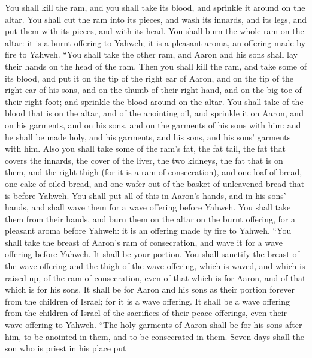  You shall kill the ram, and you shall take its blood,
and sprinkle it around on the altar.  You shall cut the
ram into its pieces, and wash its innards, and its legs, and put them
with its pieces, and with its head.  You shall burn the
whole ram on the altar: it is a burnt offering to Yahweh; it is a
pleasant aroma, an offering made by fire to Yahweh. 
``You shall take the other ram, and Aaron and his sons shall lay their
hands on the head of the ram.  Then you shall kill the
ram, and take some of its blood, and put it on the tip of the right ear
of Aaron, and on the tip of the right ear of his sons, and on the thumb
of their right hand, and on the big toe of their right foot; and
sprinkle the blood around on the altar.  You shall take
of the blood that is on the altar, and of the anointing oil, and
sprinkle it on Aaron, and on his garments, and on his sons, and on the
garments of his sons with him: and he shall be made holy, and his
garments, and his sons, and his sons' garments with him. 
Also you shall take some of the ram's fat, the fat tail, the fat that
covers the innards, the cover of the liver, the two kidneys, the fat
that is on them, and the right thigh (for it is a ram of consecration),
 and one loaf of bread, one cake of oiled bread, and one
wafer out of the basket of unleavened bread that is before Yahweh.
 You shall put all of this in Aaron's hands, and in his
sons' hands, and shall wave them for a wave offering before Yahweh.
 You shall take them from their hands, and burn them on
the altar on the burnt offering, for a pleasant aroma before Yahweh: it
is an offering made by fire to Yahweh.  ``You shall take
the breast of Aaron's ram of consecration, and wave it for a wave
offering before Yahweh. It shall be your portion.  You
shall sanctify the breast of the wave offering and the thigh of the wave
offering, which is waved, and which is raised up, of the ram of
consecration, even of that which is for Aaron, and of that which is for
his sons.  It shall be for Aaron and his sons as their
portion forever from the children of Israel; for it is a wave offering.
It shall be a wave offering from the children of Israel of the
sacrifices of their peace offerings, even their wave offering to Yahweh.
 ``The holy garments of Aaron shall be for his sons after
him, to be anointed in them, and to be consecrated in them.
 Seven days shall the son who is priest in his place put
